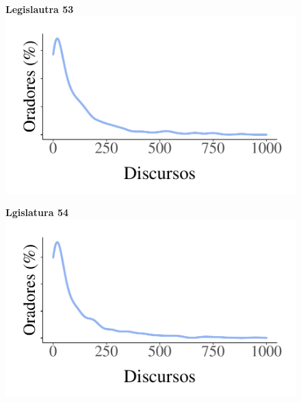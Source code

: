 \documentclass[
12pt,				%
openright,			%
twoside,			%
a4paper,			%
english,			%
french,				%
spanish,			%
brazil				%
]{abntex2}
\begin{document}
\begin{figure}[!htb]
\begin{minipage}[b]{0.3\textwidth}
	\end{minipage}
	\\
	\hspace{.05\linewidth}
	\begin{minipage}[b]{0.3\textwidth}
		\textbf{Legislautra 53}
		\label{fig:dens_legis_53}
		\centering
		\includegraphics[width=1\linewidth]{figures/dens_oradores_53}
		
	\end{minipage}
	\hspace{.05\linewidth}
	\begin{minipage}[b]{0.3\textwidth}
		\textbf{Lgislatura 54}
		\label{fig:dens_legis_54}
		\centering
		\includegraphics[width=1\linewidth]{figures/dens_oradores_54}
		

\end{minipage}
\end{figure}
\end{document}
